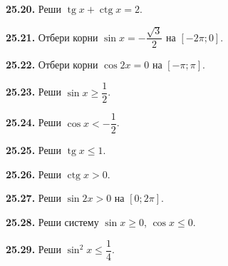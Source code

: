 \noindent\begin{minipage}[t]{\linewidth}\textbf{25.20.}\starmark{} Реши \(\operatorname{tg}x+\operatorname{ctg}x=2\).\par\end{minipage}\par
\noindent\begin{minipage}[t]{\linewidth}\textbf{25.21.} Отбери корни \(\sin x=-\dfrac{\sqrt3}2\) на \([-2\pi;0]\).\par\end{minipage}\par
\noindent\begin{minipage}[t]{\linewidth}\textbf{25.22.} Отбери корни \(\cos2x=0\) на \([-\pi;\pi]\).\par\end{minipage}\par
\noindent\begin{minipage}[t]{\linewidth}\textbf{25.23.} Реши \(\sin x\geq\dfrac12\).\par\end{minipage}\par
\noindent\begin{minipage}[t]{\linewidth}\textbf{25.24.} Реши \(\cos x<-\dfrac12\).\par\end{minipage}\par
\noindent\begin{minipage}[t]{\linewidth}\textbf{25.25.} Реши \(\operatorname{tg}x\leq1\).\par\end{minipage}\par
\noindent\begin{minipage}[t]{\linewidth}\textbf{25.26.} Реши \(\operatorname{ctg}x>0\).\par\end{minipage}\par
\noindent\begin{minipage}[t]{\linewidth}\textbf{25.27.} Реши \(\sin2x>0\) на \([0;2\pi]\).\par\end{minipage}\par
\noindent\begin{minipage}[t]{\linewidth}\textbf{25.28.} Реши систему \(\sin x\geq0\), \(\cos x\leq0\).\par\end{minipage}\par
\noindent\begin{minipage}[t]{\linewidth}\textbf{25.29.}\starmark{} Реши \(\sin^2x\leq\dfrac14\).\par\end{minipage}\par
